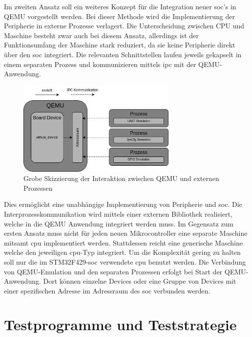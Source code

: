 Im zweiten Ansatz soll ein weiteres Konzept für die Integration neuer
\ac{soc}'s in QEMU vorgestellt werden.
Bei dieser Methode wird die Implementierung der Peripherie in externe Prozesse
verlagert.
Die Unterscheidung zwischen CPU und Maschine besteht zwar auch bei diesem
Ansatz, allerdings ist der Funktionsumfang der Maschine stark reduziert, da sie
keine Peripherie direkt über den \ac{soc} integriert.
Die relevanten Schnittstellen laufen jeweils gekapselt in einem separaten
Prozess und kommunizieren mittels \ac{ipc} mit der QEMU-Anwendung.
\begin{figure}[!htb]
    \centering
    \includegraphics[width=0.7\textwidth]{anlagen/bilder/Qemu_external_device}
    \caption{Grobe Skizzierung der Interaktion zwischen QEMU und externen Prozessen}
    \label{fig:QemuExternalDeviceErweiterung}
\end{figure}
Dies ermöglicht eine unabhängige Implementierung von Peripherie und \ac{soc}.
Die Interprozesskommunikation wird mittels einer externen Bibliothek
realisiert, welche in die QEMU Anwendung integriert werden muss.
Im Gegensatz zum ersten Ansatz muss nicht für jeden neuen Mikrocontroller eine
separate Maschine mitsamt \ac{cpu} implementiert werden.
Stattdessen reicht eine generische Maschine welche den jeweiligen \ac{cpu}-Typ
integriert.
Um die Komplexität gering zu halten soll nur die im STM32F429-\ac{soc}
verwendete \ac{cpu} benutzt werden.
Die Verbindung von QEMU-Emulation und den separaten Prozessen erfolgt bei Start
der QEMU-Anwendung.
Dort können einzelne Devices oder eine Gruppe von Devices mit einer
spezifischen Adresse im Adressraum des \ac{soc} verbunden werden.

\section{Testprogramme und Teststrategie}

